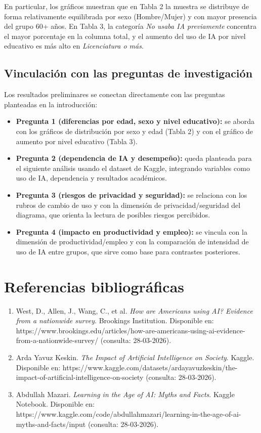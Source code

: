 \documentclass[12pt,a4paper]{article}
\begin{document}
En particular, los gráficos muestran que en Tabla 2 la muestra se distribuye de forma relativamente equilibrada por sexo (Hombre/Mujer) y con mayor presencia del grupo 60+ años. En Tabla 3, la categoría \emph{No usaba IA previamente} concentra el mayor porcentaje en la columna total, y el aumento del uso de IA por nivel educativo es más alto en \emph{Licenciatura o más}.

\subsection*{Vinculación con las preguntas de investigación}
Los resultados preliminares se conectan directamente con las preguntas planteadas en la introducción:
\begin{itemize}
    \item \textbf{Pregunta 1 (diferencias por edad, sexo y nivel educativo):} se aborda con los gráficos de distribución por sexo y edad (Tabla 2) y con el gráfico de aumento por nivel educativo (Tabla 3).
    \item \textbf{Pregunta 2 (dependencia de IA y desempeño):} queda planteada para el siguiente análisis usando el dataset de Kaggle, integrando variables como uso de IA, dependencia y resultados académicos.
    \item \textbf{Pregunta 3 (riesgos de privacidad y seguridad):} se relaciona con los rubros de cambio de uso y con la dimensión de privacidad/seguridad del diagrama, que orienta la lectura de posibles riesgos percibidos.
    \item \textbf{Pregunta 4 (impacto en productividad y empleo):} se vincula con la dimensión de productividad/empleo y con la comparación de intensidad de uso de IA entre grupos, que sirve como base para contrastes posteriores.
\end{itemize}


\section{Referencias bibliográficas}
\begin{enumerate}
    \item West, D., Allen, J., Wang, C., et al. \emph{How are Americans using AI? Evidence from a nationwide survey}. Brookings Institution. Disponible en: https://www.brookings.edu/articles/how-are-americans-using-ai-evidence-from-a-nationwide-survey/ (consulta: 28-03-2026).
    \item Arda Yavuz Keskin. \emph{The Impact of Artificial Intelligence on Society}. Kaggle. Disponible en: https://www.kaggle.com/datasets/ardayavuzkeskin/the-impact-of-artificial-intelligence-on-society (consulta: 28-03-2026).
    \item Abdullah Mazari. \emph{Learning in the Age of AI: Myths and Facts}. Kaggle Notebook. Disponible en: https://www.kaggle.com/code/abdullahmazari/learning-in-the-age-of-ai-myths-and-facts/input (consulta: 28-03-2026).
\end{enumerate}
\end{document}
